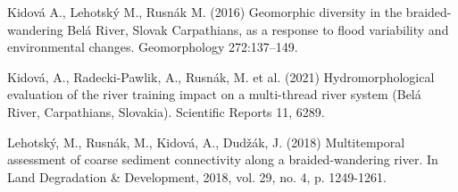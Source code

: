 {Kidová A., Lehotský M., Rusnák M. (2016) Geomorphic diversity in the braided-wandering Belá River, Slovak Carpathians, as a response to flood variability and environmental changes. Geomorphology 272:137–149.

Kidová, A., Radecki-Pawlik, A., Rusnák, M. et al. (2021) Hydromorphological evaluation of the river training impact on a multi-thread river system (Belá River, Carpathians, Slovakia). Scientific Reports 11, 6289. 

Lehotský, M., Rusnák, M., Kidová, A., Dudžák, J. (2018) Multitemporal assessment of coarse sediment connectivity along a braided-wandering river. In Land Degradation \& Development, 2018, vol. 29, no. 4, p. 1249-1261. 
}


